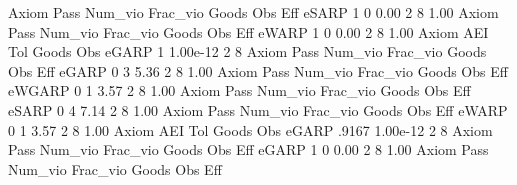 {\smallskip}
{\smallskip}
{\smallskip}
       Axiom {\VBAR} Pass     Num_vio    Frac_vio       Goods         Obs         Eff  
       eSARP {\VBAR}    1           0        0.00           2           8        1.00  
{\smallskip}
{\smallskip}
{\smallskip}
       Axiom {\VBAR} Pass     Num_vio    Frac_vio       Goods         Obs         Eff  
       eWARP {\VBAR}    1           0        0.00           2           8        1.00  
{\smallskip}
       Axiom {\VBAR}       AEI        Tol      Goods        Obs 
       eGARP {\VBAR}         1   1.00e-12          2          8 
{\smallskip}
{\smallskip}
{\smallskip}
       Axiom {\VBAR} Pass     Num_vio    Frac_vio       Goods         Obs         Eff  
       eGARP {\VBAR}    0           3        5.36           2           8        1.00  
{\smallskip}
{\smallskip}
{\smallskip}
       Axiom {\VBAR} Pass     Num_vio    Frac_vio       Goods         Obs         Eff  
      eWGARP {\VBAR}    0           1        3.57           2           8        1.00  
{\smallskip}
{\smallskip}
{\smallskip}
       Axiom {\VBAR} Pass     Num_vio    Frac_vio       Goods         Obs         Eff  
       eSARP {\VBAR}    0           4        7.14           2           8        1.00  
{\smallskip}
{\smallskip}
{\smallskip}
       Axiom {\VBAR} Pass     Num_vio    Frac_vio       Goods         Obs         Eff  
       eWARP {\VBAR}    0           1        3.57           2           8        1.00  
{\smallskip}
       Axiom {\VBAR}       AEI        Tol      Goods        Obs 
       eGARP {\VBAR}     .9167   1.00e-12          2          8 
{\smallskip}
{\smallskip}
{\smallskip}
       Axiom {\VBAR} Pass     Num_vio    Frac_vio       Goods         Obs         Eff  
       eGARP {\VBAR}    1           0        0.00           2           8        1.00  
{\smallskip}
{\smallskip}
{\smallskip}
       Axiom {\VBAR} Pass     Num_vio    Frac_vio       Goods         Obs         Eff  
